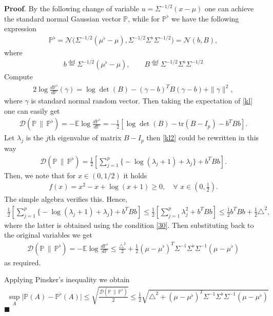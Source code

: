 \documentclass[12pt]{article}
\renewcommand{\=}[1]{\stackrel{#1}{=}} %
\newenvironment{s}{%
        \begin{trivlist} \item \textbf{Proof}. }{%
            \hspace*{\fill} $\blacksquare$\end{trivlist}}%
\begin{document}
\begin{s}
By the following change of variable $u = \Sigma^{-1/2}(x - \mu)$ one can achieve the standard normal Gaussian vector $\mathbb{P}$, while for $\mathbb{P}^{\flat}$ we have the following expression 
\begin{align}
\mathbb{P}^{\flat} = \mathcal{N}\Big(\Sigma^{-1/2}(\mu^{\flat} - \mu), \Sigma^{-1/2}\Sigma^{\flat}\Sigma^{-1/2}\Big) = \mathcal{N}(b, B),
\end{align}
where
\begin{align}
b \stackrel{\text{def}}{=} \Sigma^{-1/2}(\mu^{\flat} - \mu),  \qquad B \stackrel{\text{def}}{=} \Sigma^{-1/2}\Sigma^{\flat}\Sigma^{-1/2}
\end{align}
Compute 
\begin{align}\label{kl}
2 \log \frac{d \mathbb{P}^{\flat}}{d \mathbb{P}}(\gamma) = \log \det (B) - (\gamma - b)^T B (\gamma - b) + \| \gamma \|^2,
\end{align}
where $\gamma$ is standard normal random vector. Then taking the expectation of \eqref{kl} one can easily get 
\begin{align}\label{kl2}
\mathcal{D}(\mathbb{P} \, \| \, \mathbb{P}^{\flat}) = - \mathbb{E} \log \frac{d \mathbb{P}^{\flat}}{d\mathbb{P}} = -\frac 1 2 \left[ \log \det (B) - \text{tr}(B - I_p)  - b^T B b\right].
\end{align}
Let $\lambda_j$ is the $j$th eigenvalue of matrix $B - I_p$ then \eqref{kl2} could be rewritten in this way 
\begin{align}
\mathcal{D}(\mathbb{P} \, \| \, \mathbb{P}^{\flat}) = \frac 1 2 \left[\sum_{j=1}^p \Big\{ -\log(\lambda_j + 1) + \lambda_j \Big \} + b^TBb \right].
\end{align}
Then, we note that for $x \in (0, 1/2)$ it holds 
\begin{align}
f(x) = x^2 - x + \log (x +1) \ge 0, \quad \forall \, \, x \in \left(0, \frac 1 2 \right).
\end{align}
The simple algebra verifies this. Hence,
\begin{align}
\frac 1 2 \left[\sum_{j=1}^p \Big\{ -\log(\lambda_j + 1) + \lambda_j \Big \} + b^TBb \right] \le \frac 1 2 \left[\sum_{j = 1}^p \lambda_j^2 + b^T B b\right] \le \frac 1 2 b^T B b + \frac{1}{2} \triangle^2,
\end{align}
where the latter is obtained using the condition \eqref{30}. Then substituting back to the original variables we get 
\begin{align}
\mathcal{D}(\mathbb{P} \, \| \, \mathbb{P}^{\flat}) = - \mathbb{E} \log \frac{d \mathbb{P}^{\flat}}{d\mathbb{P}} \le \frac{\triangle^2}{2} + \frac 1 2 (\mu - \mu^{\flat})^T \Sigma^{-1} \Sigma^{\flat} \Sigma^{-1}(\mu - \mu^{\flat})
\end{align}
as required. 
\par Applying Pinsker's inequality we obtain 
\begin{align}
\sup_{A} \big| \mathbb{P}(A) - \mathbb{P}^{\flat}(A) \big| \le \sqrt{\frac {\mathcal{D}(\mathbb{P} \, \| \, \mathbb{P}^{\flat})}{2}} \le \frac{1}{2} \sqrt{\triangle^2 + (\mu - \mu^{\flat})^T \Sigma^{-1} \Sigma^{\flat} \Sigma^{-1}(\mu - \mu^{\flat})}
\end{align}
\end{s}
\end{document}
